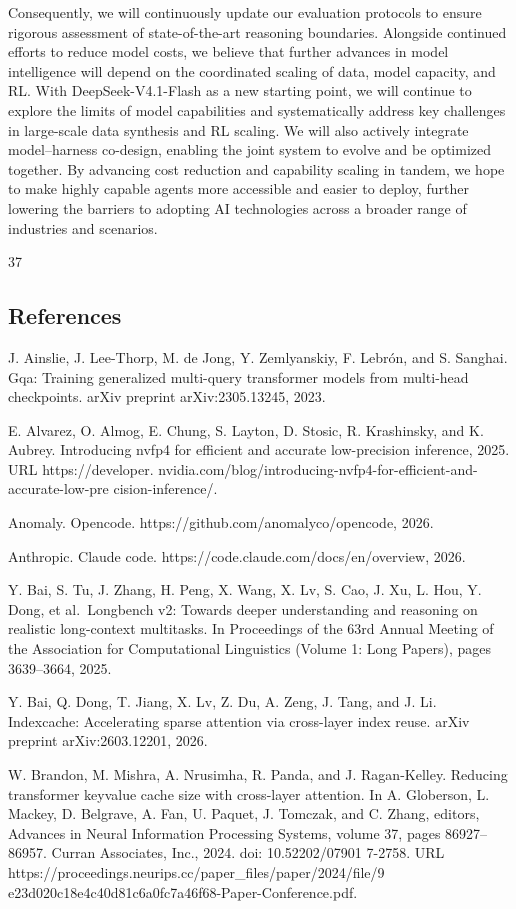 \documentclass[
  10
]{article}
\begin{document}
Consequently, we will continuously update our evaluation protocols to
ensure rigorous assessment of state-of-the-art reasoning boundaries.
Alongside continued efforts to reduce model costs, we believe that
further advances in model intelligence will depend on the coordinated
scaling of data, model capacity, and RL. With DeepSeek-V4.1-Flash as a
new starting point, we will continue to explore the limits of model
capabilities and systematically address key challenges in large-scale
data synthesis and RL scaling. We will also actively integrate
model--harness co-design, enabling the joint system to evolve and be
optimized together. By advancing cost reduction and capability scaling
in tandem, we hope to make highly capable agents more accessible and
easier to deploy, further lowering the barriers to adopting AI
technologies across a broader range of industries and scenarios.

37

\subsection{References}\label{references}

J. Ainslie, J. Lee-Thorp, M. de Jong, Y. Zemlyanskiy, F. Lebrón, and S.
Sanghai. Gqa: Training generalized multi-query transformer models from
multi-head checkpoints. arXiv preprint arXiv:2305.13245, 2023.

E. Alvarez, O. Almog, E. Chung, S. Layton, D. Stosic, R. Krashinsky, and
K. Aubrey. Introducing nvfp4 for efficient and accurate low-precision
inference, 2025. URL https://developer.
nvidia.com/blog/introducing-nvfp4-for-efficient-and-accurate-low-pre
cision-inference/.

Anomaly. Opencode. https://github.com/anomalyco/opencode, 2026.

Anthropic. Claude code. https://code.claude.com/docs/en/overview, 2026.

Y. Bai, S. Tu, J. Zhang, H. Peng, X. Wang, X. Lv, S. Cao, J. Xu, L. Hou,
Y. Dong, et al.~Longbench v2: Towards deeper understanding and reasoning
on realistic long-context multitasks. In Proceedings of the 63rd Annual
Meeting of the Association for Computational Linguistics (Volume 1: Long
Papers), pages 3639--3664, 2025.

Y. Bai, Q. Dong, T. Jiang, X. Lv, Z. Du, A. Zeng, J. Tang, and J. Li.
Indexcache: Accelerating sparse attention via cross-layer index reuse.
arXiv preprint arXiv:2603.12201, 2026.

W. Brandon, M. Mishra, A. Nrusimha, R. Panda, and J. Ragan-Kelley.
Reducing transformer keyvalue cache size with cross-layer attention. In
A. Globerson, L. Mackey, D. Belgrave, A. Fan, U. Paquet, J. Tomczak, and
C. Zhang, editors, Advances in Neural Information Processing Systems,
volume 37, pages 86927--86957. Curran Associates, Inc., 2024. doi:
10.52202/07901 7-2758. URL
https://proceedings.neurips.cc/paper\_files/paper/2024/file/9
e23d020c18e4c40d81c6a0fc7a46f68-Paper-Conference.pdf.
\end{document}
